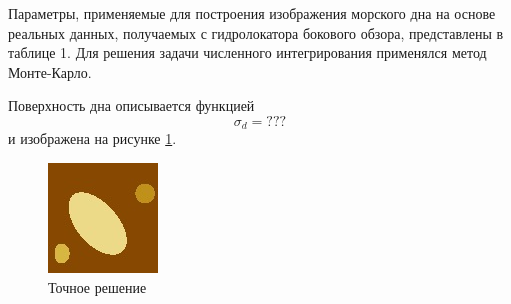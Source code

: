 \documentclass{procDDs}
\begin{document}
Параметры, применяемые для построения изображения морского дна на основе реальных данных, получаемых с гидролокатора бокового обзора, представлены в таблице 1. Для решения задачи численного интегрирования применялся метод Монте-Карло. 
\begin{table}[!ht]
	\label{table:name}
\end{table}

Поверхность дна описывается функцией 
\begin{equation}
	\sigma_d=???
\end{equation}
 и изображена на рисунке \ref{ris:dno}.

\begin{figure}[h!]\center
	
		\includegraphics[width=0.3\linewidth]{img/dno.jpg}
	\caption{Точное решение}
	\label{ris:dno}
\end{figure}
\end{document}
